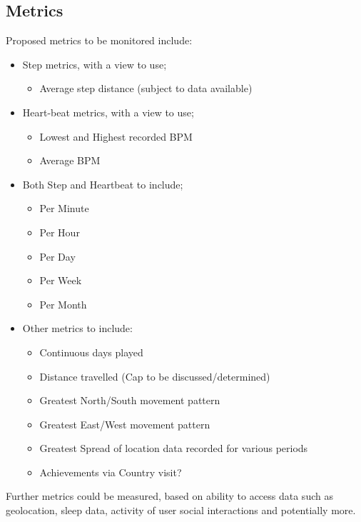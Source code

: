 \documentclass{article}
\begin{document}
        \subsection{Metrics}
        Proposed metrics to be monitored include:
        \begin{itemize}
            \item Step metrics, with a view to use;
            \begin{itemize}
                \item Average step distance (subject to data available)
            \end{itemize}
            \item Heart-beat metrics, with a view to use;
            \begin{itemize}
                \item Lowest and Highest recorded BPM
                \item Average BPM
            \end{itemize}
            \item Both Step and Heartbeat to include;
            \begin{itemize}
                \item Per Minute
                \item Per Hour
                \item Per Day
                \item Per Week
                \item Per Month
            \end{itemize}
            \item Other metrics to include:
            \begin{itemize}
                \item Continuous days played
                \item Distance travelled (Cap to be discussed/determined)
                \item Greatest North/South movement pattern
                \item Greatest East/West movement pattern
                \item Greatest Spread of location data recorded for various periods
                \item Achievements via Country visit?
            \end{itemize}
        \end{itemize}
        Further metrics could be measured, based on ability to access data such as geolocation,
        sleep data, activity of user social interactions and potentially more.
\end{document}
